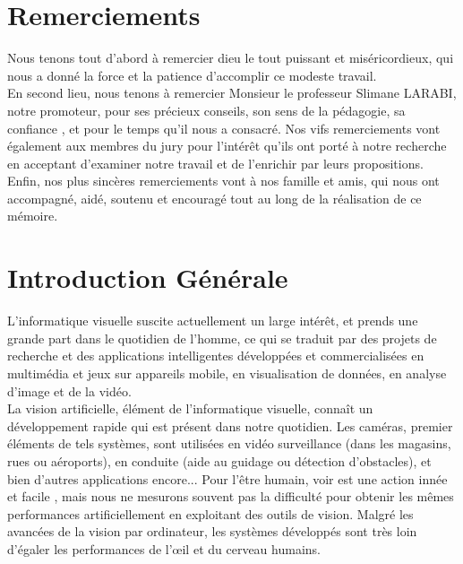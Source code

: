 \documentclass[12pt,a4paper,oneside]{book}
\begin{document}
	\chapter*{Remerciements}
	Nous tenons tout d'abord à remercier dieu le tout puissant et miséricordieux, qui nous a donné la force et la patience d'accomplir ce modeste travail.\\
	En second lieu, nous tenons à remercier Monsieur le professeur Slimane LARABI, notre promoteur, pour ses précieux conseils, son sens de la pédagogie, sa confiance , et pour le temps qu’il nous a consacré.
	Nos vifs remerciements vont également aux membres du jury pour l'intérêt qu'ils ont porté à notre recherche en acceptant d'examiner notre travail et de l'enrichir par leurs propositions.\\
	Enfin, nos plus sincères remerciements vont à nos famille et amis, qui nous ont accompagné, aidé, soutenu et encouragé tout au long de la réalisation de ce mémoire.
	\tableofcontents
	
	
	\listoffigures
	\newpage
	
	
	\chapter*{Introduction Générale}
	
	
	
	L'informatique visuelle suscite actuellement un large intérêt, et prends une grande part dans le quotidien de l'homme, ce qui se traduit par des projets de recherche  et des applications intelligentes développées et commercialisées en multimédia et jeux sur appareils mobile, en visualisation de données, en analyse d'image et de la vidéo.\\
	
	La vision artificielle, élément de l'informatique visuelle, connaît un développement rapide qui est présent dans notre quotidien. Les caméras, premier éléments de tels systèmes, sont utilisées en vidéo surveillance (dans les magasins, rues ou aéroports), en conduite (aide au guidage ou détection d’obstacles), et bien d’autres applications encore... Pour l’être humain, voir est une action innée et facile , mais  nous ne mesurons souvent pas la difficulté pour obtenir les mêmes performances artificiellement en exploitant des outils de vision. Malgré les avancées de la vision par ordinateur, les systèmes développés sont très loin d’égaler les performances de l’œil et du cerveau humains.\\
	
\end{document}
